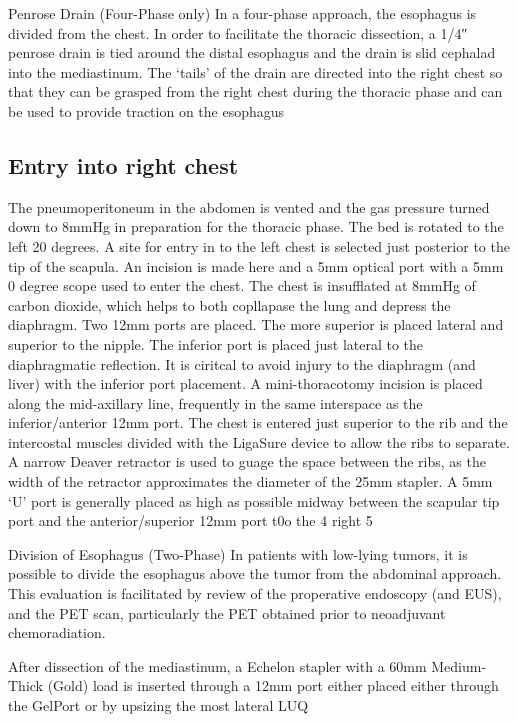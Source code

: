 \documentclass[
  letterpaper,
]{scrbook}
\begin{document}
Penrose Drain (Four-Phase only) In a four-phase approach, the esophagus
is divided from the chest. In order to facilitate the thoracic
dissection, a 1/4″ penrose drain is tied around the distal esophagus and
the drain is slid cephalad into the mediastinum. The `tails' of the
drain are directed into the right chest so that they can be grasped from
the right chest during the thoracic phase and can be used to provide
traction on the esophagus

\subsection{Entry into right chest}\label{entry-into-right-chest}

The pneumoperitoneum in the abdomen is vented and the gas pressure
turned down to 8mmHg in preparation for the thoracic phase. The bed is
rotated to the left 20 degrees. A site for entry in to the left chest is
selected just posterior to the tip of the scapula. An incision is made
here and a 5mm optical port with a 5mm 0 degree scope used to enter the
chest. The chest is insufflated at 8mmHg of carbon dioxide, which helps
to both copllapase the lung and depress the diaphragm. Two 12mm ports
are placed. The more superior is placed lateral and superior to the
nipple. The inferior port is placed just lateral to the diaphragmatic
reflection. It is ciritcal to avoid injury to the diaphragm (and liver)
with the inferior port placement. A mini-thoracotomy incision is placed
along the mid-axillary line, frequently in the same interspace as the
inferior/anterior 12mm port. The chest is entered just superior to the
rib and the intercostal muscles divided with the LigaSure device to
allow the ribs to separate. A narrow Deaver retractor is used to guage
the space between the ribs, as the width of the retractor approximates
the diameter of the 25mm stapler. A 5mm `U' port is generally placed as
high as possible midway between the scapular tip port and the
anterior/superior 12mm port t0o the 4 right 5

Division of Esophagus (Two-Phase) In patients with low-lying tumors, it
is possible to divide the esophagus above the tumor from the abdominal
approach. This evaluation is facilitated by review of the properative
endoscopy (and EUS), and the PET scan, particularly the PET obtained
prior to neoadjuvant chemoradiation.

After dissection of the mediastinum, a Echelon stapler with a 60mm
Medium-Thick (Gold) load is inserted through a 12mm port either placed
either through the GelPort or by upsizing the most lateral LUQ
\end{document}
